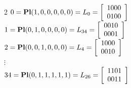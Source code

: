 \begin{multicols}{2}
$0={\rm\bf Pl}(1,0,0,0,0,0 )=
L_{0}=\left[
\begin{array}{c}
1000\\
0100\\
\end{array}
\right]
$\\
$1={\rm\bf Pl}(0,1,0,0,0,0 )=
L_{34}=\left[
\begin{array}{c}
0010\\
0001\\
\end{array}
\right]
$\\
$2={\rm\bf Pl}(0,0,1,0,0,0 )=
L_{4}=\left[
\begin{array}{c}
1000\\
0010\\
\end{array}
\right]
$\\
$\vdots$\\
$34={\rm\bf Pl}(0,1,1,1,1,1 )=
L_{26}=\left[
\begin{array}{c}
1101\\
0011\\
\end{array}
\right]
$\\
\end{multicols}
